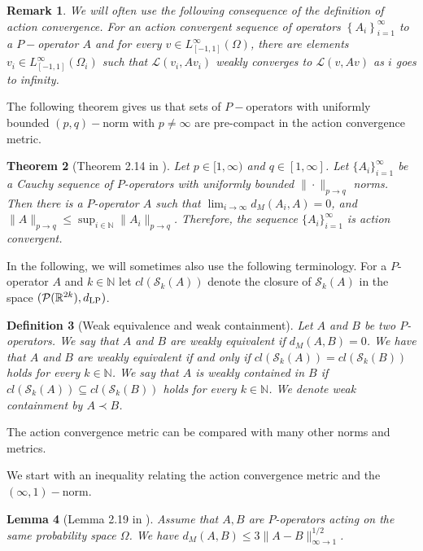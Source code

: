 \documentclass[11pt]{article}
\newtheorem{theorem}{Theorem}[section]
\newtheorem{lemma}[theorem]{Lemma}
\newtheorem{definition}[theorem]{Definition}
\newtheorem{remark}[theorem]{Remark}
\begin{document}
\begin{remark}
We will often use the following consequence of the definition of action convergence. For an action convergent sequence of operators $\left\{A_i\right\}_{i=1}^{\infty}$ to a $P-$operator $A$ and for every $v \in L_{[-1,1]}^{\infty}(\Omega)$, there are elements $v_i \in L_{[-1,1]}^{\infty}\left(\Omega_i\right)$ such that $\mathcal{L}\left(v_i,Av_i\right)$ weakly converges to $\mathcal{L}(v,Av)$ as $i$ goes to infinity.
\end{remark}

The following theorem gives us that sets of $P-$operators with uniformly bounded $(p,q)-$norm with $p\neq \infty$ are pre-compact in the action convergence metric.

\begin{theorem}[Theorem 2.14 in \cite{backhausz2018action}] Let $p\in [1,\infty)$ and $q\in [1,\infty]$. Let $\{A_i\}_{i=1}^\infty$ be a Cauchy sequence of $P$-operators with uniformly bounded $\|\cdot\|_{p\to q}$ norms. Then there is a $P$-operator $A$ such that $\lim_{i\to\infty} d_M(A_i,A)=0$, and $\|A\|_{p\to q}\leq\sup_{i\in\mathbb{N}}\|A_i\|_{p\to q}$. Therefore, the sequence $\{A_i\}_{i=1}^\infty$ is action convergent. 
\end{theorem}

In the following, we will sometimes also use the following terminology. For a $P$-operator $A$ and $k\in\mathbb{N}$ let $cl(\mathcal{S}_k(A))$ denote the closure of $\mathcal{S}_k(A)$ in the space $(\mathcal{P}(\mathbb{R}^{2k}),d_{\rm LP})$.

\begin{definition} [Weak equivalence and weak containment] Let $A$ and $B$ be two $P$-operators. We say that $A$ and $B$ are  weakly equivalent if $d_M(A,B)=0$. We have that $A$ and $B$ are weakly equivalent if and only if $cl(\mathcal{S}_k(A))=cl(\mathcal{S}_k(B))$ holds for every $k\in\mathbb{N}$. We say that $A$ is weakly contained in $B$ if $cl(\mathcal{S}_k(A))\subseteq cl(\mathcal{S}_k(B))$ holds for every $k\in\mathbb{N}$. We denote weak containment by $A\prec B$.
\end{definition}

The action convergence metric can be compared with many other norms and metrics.

We start with an inequality relating the action convergence metric and the $(\infty,1)-$norm.

\begin{lemma}[Lemma 2.19 in \cite{backhausz2018action}]  Assume that $A,B$ are $P$-operators acting on the same probability space $\Omega$. We have  $d_M(A,B)\leq 3\|A-B\|_{\infty\to 1}^{1/2}$.
\end{lemma}
\end{document}
